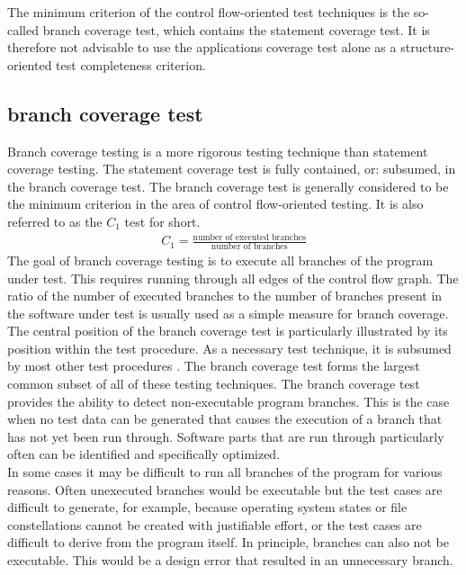 	The minimum criterion of the control flow-oriented test techniques is the so-called branch coverage test, which contains the statement coverage test. It is therefore not advisable to use the applications coverage test alone as a structure-oriented test completeness criterion.

	\subsection{branch coverage test}
	Branch coverage testing is a more rigorous testing technique than statement coverage testing. The statement coverage test is fully contained, or: subsumed, in the branch coverage test. The branch coverage test is generally considered to be the minimum criterion in the area of control flow-oriented testing. It is also referred to as the $C_1$ test for short.
		\begin{align*}
		C_1 = \frac{\textrm{number of executed branches}}{\textrm{number of branches}}
		\end{align*}
	The goal of branch coverage testing is to execute all branches of the program under test. This requires running through all edges of the control flow graph. The ratio of the number of executed branches to the number of branches present in the software under test is usually used as a simple measure for branch coverage. The central position of the branch coverage test is particularly illustrated by its position within the test procedure. As a necessary test technique, it is subsumed by most other test procedures . The branch coverage test forms the largest common subset of all of these testing techniques. The branch coverage test provides the ability to detect non-executable program branches. This is the case when no test data can be generated that causes the execution of a branch that has not yet been run through. Software parts that are run through particularly often can be identified and specifically optimized. \\
	In some cases it may be difficult to run all branches of the program for various reasons. Often unexecuted branches would be executable but the test cases are difficult to generate, for example, because operating system states or file constellations cannot be created with justifiable effort, or the test cases are difficult to derive from the program itself. In principle, branches can also not be executable. This would be a design error that resulted in an unnecessary branch. \\

